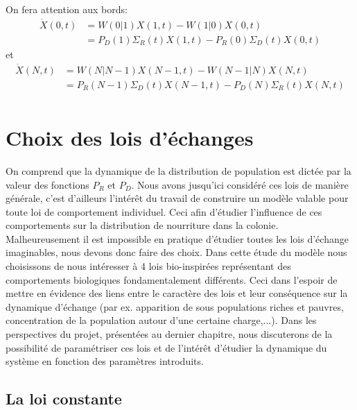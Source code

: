 On fera attention aux bords:\\
\begin{equation}
\begin{aligned}
\dot{X}(0,t) 	&= W(0|1) X(1,t) - W(1|0) X(0,t)\\
				&= P_D(1) \Sigma_R(t) X(1,t) - P_R(0) \Sigma_D(t) X(0,t)
\label{bord0}
\end{aligned}
\end{equation}
 et 
\begin{equation}
\begin{aligned}
\dot{X}(N,t) 	&= W(N|N-1) X(N-1,t) - W(N-1|N) X(N,t)\\
				&= P_R(N-1) \Sigma_D(t) X(N-1,t)- P_D(N) \Sigma_R(t) X(N,t)\\
\label{bordN}
\end{aligned}
\end{equation}



\section{Choix des lois d'échanges}

On comprend que la dynamique de la distribution de population est dictée par la valeur des fonctions $P_R$ et $P_D$. Nous avons jusqu'ici considéré ces lois de manière générale, c'est d'ailleurs l'intérêt du travail de construire un modèle valable pour toute loi de comportement individuel. Ceci afin d'étudier l'influence de ces comportements sur la distribution de nourriture dans la colonie.\\

Malheureusement il est impossible en pratique d'étudier toutes les lois d'échange imaginables, nous devons donc faire des choix. Dans cette étude du modèle nous choisissons de nous intéresser à 4 lois bio-inspirées représentant des comportements biologiques fondamentalement différents. Ceci dans l'espoir de mettre en évidence des liens entre le caractère des lois et leur conséquence sur la dynamique d'échange (par ex. apparition de sous populations riches et pauvres, concentration de la population autour d'une certaine charge,...). Dans les perspectives du projet, présentées au dernier chapitre, nous discuterons de la possibilité de paramétriser ces lois et de l'intérêt d'étudier la dynamique du système en fonction des paramètres introduits.\\


\subsection{La loi constante}

